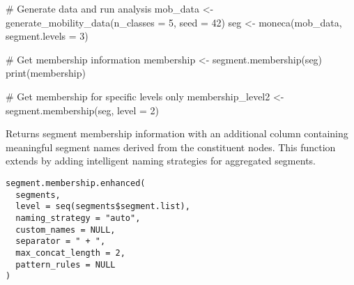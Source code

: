 \documentclass[a4paper]{book}
\begin{document}
%
\begin{Examples}
\begin{ExampleCode}
# Generate data and run analysis
mob_data <- generate_mobility_data(n_classes = 5, seed = 42)
seg <- moneca(mob_data, segment.levels = 3)

# Get membership information
membership <- segment.membership(seg)
print(membership)

# Get membership for specific levels only
membership_level2 <- segment.membership(seg, level = 2)

\end{ExampleCode}
\end{Examples}
%
\begin{Description}
Returns segment membership information with an additional column containing 
meaningful segment names derived from the constituent nodes. This function 
extends  by adding intelligent naming 
strategies for aggregated segments.
\end{Description}
%
\begin{Usage}
\begin{verbatim}
segment.membership.enhanced(
  segments,
  level = seq(segments$segment.list),
  naming_strategy = "auto",
  custom_names = NULL,
  separator = " + ",
  max_concat_length = 2,
  pattern_rules = NULL
)
\end{verbatim}
\end{Usage}
%
\end{document}
